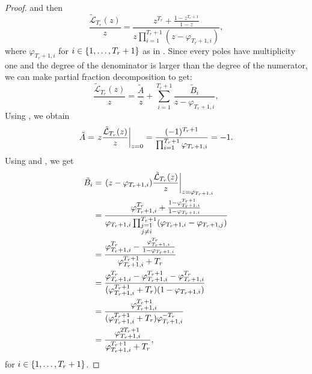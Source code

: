 \documentclass{article}
\begin{document}
\begin{proof}
      and then 
      \begin{equation}
        \frac{\tilde{\mathcal{L}}_{T_r}(z)}{z} = \frac{z^{T_r} + \frac{1-z^{T_r + 1}}{1 - z}}{z \prod_{i=1}^{T_r + 1} (z - \varphi_{T_r + 1, i})},
      \end{equation}
      where $\varphi_{T_r + 1, i}$ for $i \in \{1, \dots, T_r + 1\}$ as in . Since every poles have multiplicity one and the degree of the denominator is larger than the degree of the numerator, we can make partial fraction decomposition to get:
      \begin{equation}
        \frac{\tilde{\mathcal{L}}_{T_r}(z)}{z} =  \frac{\tilde{A}}{z} + \sum_{i=1}^{T_r + 1} \frac{\tilde{B}_i}{z - \varphi_{T_r + 1, i}},
      \end{equation}
      Using , we obtain
      \begin{equation}
        \tilde{A} = \left.z\frac{\tilde{\mathcal{L}}_{T_r}(z)}{z}\right|_{z = 0} = \frac{(-1)^{T_r + 1}}{\prod_{i=1}^{T_r + 1} \varphi_{T_r + 1, i}} = -1.
      \end{equation}
      Using  and , we get
      \begin{align}
        \tilde{B}_i & = \left.(z - \varphi_{T_r + 1, i})\frac{\tilde{\mathcal{L}}_{T_r}(z)}{z}\right|_{z = \varphi_{T_r + 1, i}}  \\  
        & =  \frac{\varphi_{T_r + 1, i}^{T_r} + \frac{1 - \varphi_{T_r + 1, i}^{T_r + 1}}{1 - \varphi_{T_r + 1, i}}}
        {\varphi_{T_r + 1, i} \prod_{\substack{j=1 \\ j \neq i}}^{T_r + 1} (\varphi_{T_r + 1, i} - \varphi_{T_r + 1, j})} \\
        & =  \frac{\varphi_{T_r + 1, i}^{T_r} - \frac{\varphi_{T_r + 1, i}^{T_r}}{1-\varphi_{T_r + 1, i}}}
        {\varphi_{T_r + 1, i}^{T_r + 1} + T_r} \\
        & =  \frac{\varphi_{T_r + 1, i}^{T_r} - \varphi_{T_r + 1, i}^{T_r+1} - \varphi_{T_r + 1, i}^{T_r}}
        {(\varphi_{T_r + 1, i}^{T_r + 1} + T_r)(1-\varphi_{T_r + 1, i})} \\
        & =  \frac{\varphi_{T_r + 1, i}^{T_r+1}}
        {(\varphi_{T_r + 1, i}^{T_r + 1} + T_r)\varphi_{T_r + 1, i}^{-T_r}} \\
        & =  \frac{\varphi_{T_r + 1, i}^{2T_r + 1}}
        {\varphi_{T_r + 1, i}^{T_r + 1} + T_r},
      \end{align} 
      for $i \in \{1, \dots, T_r + 1\}$.
    \end{proof}
\end{document}
